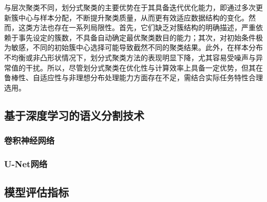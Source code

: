 与层次聚类不同，划分式聚类的主要优势在于其具备迭代优化能力，即通过多次更新簇中心与样本分配，不断提升聚类质量，从而更有效适应数据结构的变化。然而，这类方法也存在一系列局限性。首先，它们缺乏对簇结构的明确描述，严重依赖于事先设定的簇数，不具备自动确定最优聚类数目的能力；其次，对初始条件极为敏感，不同的初始簇中心选择可能导致截然不同的聚类结果。此外，在样本分布不均衡或非凸形状情况下，划分式聚类方法的表现明显下降，尤其容易受噪声与异常值的干扰。所以，尽管划分式聚类在优化性与计算效率上具备一定优势，但其在鲁棒性、自适应性与非理想分布处理能力方面存在不足，需结合实际任务特性合理选用。

\subsection{基于深度学习的语义分割技术}

\subsubsection{卷积神经网络}

\subsubsection{U-Net网络}


\subsection{模型评估指标}